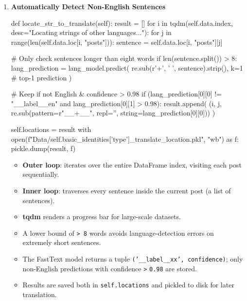 \documentclass[12pt]{article}
\numberwithin{figure}{section}  %
\begin{document}

\setcounter{enumi}{7} %

\begin{enumerate}
\item \textbf{Automatically Detect Non-English Sentences}

\begin{python}
def locate_str_to_translate(self):
    result = []
    for i in tqdm(self.data.index,
                  desc="Locating strings of other languages..."):
        for j in range(len(self.data.loc[i, "posts"])):
            sentence = self.data.loc[i, "posts"][j]

            # Only check sentences longer than eight words
            if len(sentence.split()) > 8:
                lang_prediction = lang_model.predict(
                    re.sub(r'\s+', ' ', sentence).strip(),
                    k=1                             # top-1 prediction
                )

                # Keep if not English & confidence > 0.98
                if (lang_prediction[0][0] != "__label__en"
                        and lang_prediction[0][1] > 0.98):
                    result.append(
                        (i, j,
                         re.sub(pattern=r"__\w+__",
                                repl='',
                                string=lang_prediction[0][0]))
                    )

    self.locations = result
    with open(f"Data/{self.basic_identities['type']}_translate_location.pkl",
              "wb") as f:
        pickle.dump(result, f)
\end{python}

\begin{itemize}
  \item \textbf{Outer loop}: iterates over the entire DataFrame index, visiting each post sequentially.
  \item \textbf{Inner loop}: traverses every sentence inside the current post (a list of sentences).
  \item \textbf{tqdm} renders a progress bar for large-scale datasets.
  \item A lower bound of \texttt{> 8} words avoids language-detection errors on extremely short sentences.
  \item The FastText model returns a tuple \texttt{('\_\_label\_\_xx', confidence)}; only non-English predictions with confidence \texttt{>} \texttt{0.98} are stored.
  \item Results are saved both in \texttt{self.locations} and pickled to disk for later translation.
\end{itemize}


\end{enumerate}
\end{document}

